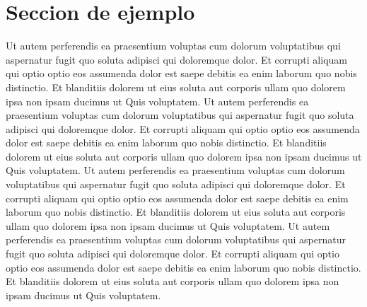 \section{Seccion de ejemplo}
    Ut autem perferendis ea praesentium voluptas cum dolorum voluptatibus qui aspernatur fugit quo soluta adipisci qui doloremque dolor. Et corrupti aliquam qui optio optio eos assumenda dolor est saepe debitis ea enim laborum quo nobis distinctio. Et blanditiis dolorem ut eius soluta aut corporis ullam quo dolorem ipsa non ipsam ducimus ut Quis voluptatem.
    \newline 
    Ut autem perferendis ea praesentium voluptas cum dolorum voluptatibus qui aspernatur fugit quo soluta adipisci qui doloremque dolor. Et corrupti aliquam qui optio optio eos assumenda dolor est saepe debitis ea enim laborum quo nobis distinctio. Et blanditiis dolorem ut eius soluta aut corporis ullam quo dolorem ipsa non ipsam ducimus ut Quis voluptatem.
    \newline 
    Ut autem perferendis ea praesentium voluptas cum dolorum voluptatibus qui aspernatur fugit quo soluta adipisci qui doloremque dolor. Et corrupti aliquam qui optio optio eos assumenda dolor est saepe debitis ea enim laborum quo nobis distinctio. Et blanditiis dolorem ut eius soluta aut corporis ullam quo dolorem ipsa non ipsam ducimus ut Quis voluptatem.
    \newline 
    Ut autem perferendis ea praesentium voluptas cum dolorum voluptatibus qui aspernatur fugit quo soluta adipisci qui doloremque dolor. Et corrupti aliquam qui optio optio eos assumenda dolor est saepe debitis ea enim laborum quo nobis distinctio. Et blanditiis dolorem ut eius soluta aut corporis ullam quo dolorem ipsa non ipsam ducimus ut Quis voluptatem.
